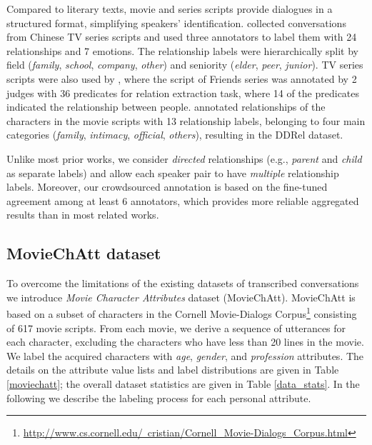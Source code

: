 Compared to literary texts, movie and series scripts provide dialogues in a structured format, simplifying speakers' identification. \citet{chen2020mpdd} collected conversations from Chinese TV series scripts and used three annotators to label them with 24 relationships and 7 emotions. The relationship labels were hierarchically split by field (\textit{family}, \textit{school}, \textit{company}, \textit{other}) and seniority (\textit{elder}, \textit{peer}, \textit{junior}). TV series scripts were also used by \citet{yu-etal-2020-dialogue}, where the script of Friends series was annotated by 2 judges with 36 predicates for relation extraction task, where 14 of the predicates indicated the relationship between people. \citet{jia2020ddrel} annotated relationships of the characters in the movie scripts with 13 relationship labels, belonging to four main categories (\textit{family}, \textit{intimacy}, \textit{official}, \textit{others}), resulting in the DDRel dataset. 

Unlike most prior works, we consider \emph{directed} relationships (e.g., \emph{parent} and \emph{child} as separate labels) and allow each speaker pair to have \emph{multiple} relationship labels. Moreover, our crowdsourced annotation is based on the fine-tuned agreement among at least 6 annotators, which provides more reliable aggregated results than in most related works.

\subsection{MovieChAtt dataset}
\label{data_moviechatt}

To overcome the limitations of the existing datasets of transcribed conversations we introduce \textit{Movie Character Attributes} dataset (MovieChAtt).
MovieChAtt is based on a subset of characters in the Cornell Movie-Dialogs Corpus\footnote{\href{https://www.cs.cornell.edu/~cristian/Cornell_Movie-Dialogs_Corpus.html}{http://www.cs.cornell.edu/~cristian/Cornell\_Movie-Dialogs\_Corpus.html}} \cite{danescu2011chameleons} consisting of 617 movie scripts. From each movie, we derive a sequence of utterances for each character, excluding the characters who have less than 20 lines in the movie. We label the acquired characters with \textit{age}, \textit{gender}, and \textit{profession} attributes. The details on the attribute value lists and label distributions are given in Table \ref{moviechatt}; the overall dataset statistics are given in Table \ref{data_stats}. In the following we describe the labeling process for each personal attribute.

